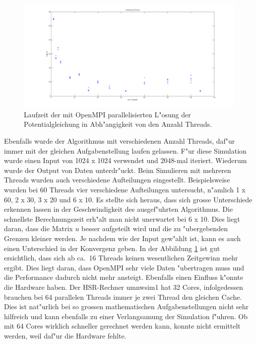 \begin{refsection}
\begin{figure}
\centering 
\includegraphics[width=\hsize]{potential/images/Resultate/threads}
\caption{Laufzeit der mit OpenMPI parallelisierten L"osung der
Potentialgleichung in Abh"angigkeit von den Anzahl Threads.}
\label{threads}
\end{figure}

Ebenfalls wurde der Algorithmus mit verschiedenen Anzahl
Threads, daf"ur immer mit der gleichen Aufgabenstellung laufen
gelassen. F"ur diese Simulation wurde einen Input von 1024 x 1024
verwendet und 2048-mal iteriert. Wiederum wurde der Output von
Daten unterdr"uckt. Beim Simulieren mit mehreren Threads wurden auch
verschiedene Aufteilungen eingestellt. Beispielsweise wurden bei 60
Threads vier verschiedene Aufteilungen untersucht, n"amlich 1 x 60,
2 x 30, 3 x 20 und 6 x 10. Es stellte sich heraus, dass sich grosse
Unterschiede erkennen lassen in der Geschwindigkeit des ausgef"uhrten
Algorithmus. Die schnellste Berechnungszeit erh"alt man nicht unerwartet
bei 6 x 10. Dies liegt daran, dass die Matrix $u$ besser aufgeteilt
wird und die zu "ubergebenden Grenzen kleiner werden. Je nachdem wie
der Input gew"ahlt ist, kann es auch einen Unterschied in der Konvergenz
geben. In der Abbildung \ref{threads} ist gut ersichtlich, dass sich ab
ca.~16 Threads keinen wesentlichen Zeitgewinn mehr ergibt. Dies liegt
daran, dass OpenMPI sehr viele Daten "ubertragen muss und die Performance
dadurch nicht mehr ansteigt. Ebenfalls einen Einfluss k"onnte die Hardware
haben. Der HSR-Rechner umnwsim1 hat 32 Cores, infolgedessen brauchen
bei 64 parallelen Threads immer je zwei Thread den gleichen Cache. Dies
ist nat"urlich bei so grossen mathematischen Aufgabenstellungen nicht
sehr hilfreich und kann ebenfalls zu einer Verlangsamung der Simulation
f"uhren. Ob mit 64 Cores wirklich schneller gerechnet werden kann,
konnte nicht ermittelt werden, weil daf"ur die Hardware fehlte.


\end{refsection}
